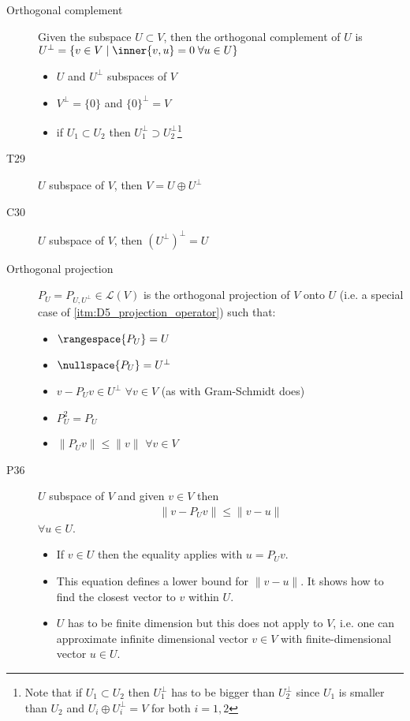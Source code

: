\begin{description}
\item[Orthogonal complement] Given the subspace $U\subset V$, then the orthogonal complement of $U$ is $U^\perp = \{v\in V \mid \inner{v,u}=0 \;\forall u\in U \}$
\begin{itemize}
\item $U$ and $U^\perp$ subspaces of $V$
\item $V^\perp=\{0\}$ and $\{0\}^\perp = V$
\item if $U_1\subset U_2$ then $U_1^\perp \supset U_2^\perp$\footnote{Note that if $U_1\subset U_2$ then $U_1^\perp$ has to be bigger than $U_2^\perp$ since $U_1$ is smaller than $U_2$ and $U_i\oplus U_i^\perp = V$ for both $i=1,2$}
\end{itemize}
\item[T29] $U$ subspace of $V$, then $V=U\oplus U^\perp$
\item[C30] $U$ subspace of $V$, then $(U^\perp)^\perp = U$
\item[Orthogonal projection\label{itm:D6_orthogonal_projection}] $P_U = P_{U,U^\perp} \in \mathcal{L}(V)$ is the orthogonal projection of $V$ onto $U$ (i.e. a special case of \ref{itm:D5_projection_operator}) such that:
\begin{itemize}
\item $\rangespace{P_U} = U$
\item $\nullspace{P_U} = U^\perp$
\item $v - P_Uv \in U^\perp$  $\forall v\in V$ (as with Gram-Schmidt does)
\item $P_U^2 = P_U$
\item $\|P_U v\| \leq \|v\|$   $\forall v\in V$
\end{itemize}

\item[P36] $U$ subspace of $V$ and given $v\in V$ then
\begin{align*}
\|v - P_Uv\| \leq \|v - u\|
\end{align*}
$\forall u\in U$. 
\begin{itemize}
\item If $v\in U$ then the equality applies with $u=P_Uv$.
\item This equation defines a lower bound for $\|v - u\|$. It shows how to find the closest vector to $v$ within $U$.
\item $U$ has to be finite dimension but this does not apply to $V$, i.e. one can approximate infinite dimensional vector $v\in V$ with finite-dimensional vector $u\in U$.
\end{itemize}


\end{description}
